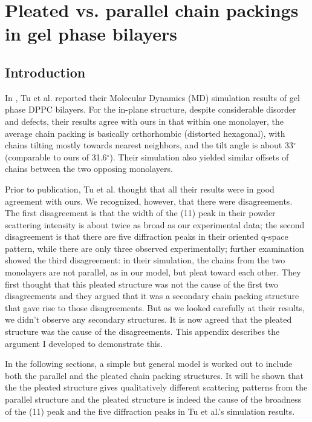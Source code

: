 \chapter{Pleated vs. parallel chain packings in gel phase bilayers}

\section{Introduction}

In \cite{Tu96}, Tu et al. reported their Molecular Dynamics (MD) 
simulation results 
of gel phase DPPC bilayers. For the in-plane structure, despite considerable
disorder and defects, their results agree with ours \cite{Sun94} in that within
one monolayer, the average chain packing is basically 
orthorhombic (distorted hexagonal), with
chains tilting mostly towards nearest neighbors, and the tilt angle is about
33$^{\circ}$ (comparable to ours of 31.6$^{\circ}$). Their simulation 
also yielded similar offsets of chains between the two opposing monolayers.

Prior to publication, Tu et al. thought that all their results were in good
agreement with ours. We recognized, however, that there were disagreements.
The first disagreement is that the width of the (11) peak in their powder
scattering intensity is about twice as broad as our experimental
data; the second disagreement is that there are five diffraction peaks
in their oriented q-space pattern, while there are only three
observed experimentally; further examination showed the third
disagreement: in their simulation, the chains from the two monolayers 
are not parallel, as in our model, but pleat toward each other. 
They first thought that this pleated structure was not the cause of the
first two disagreements and they argued that it was a secondary chain 
packing structure that gave rise to those disagreements. But as we
looked carefully at their results, we didn't observe any secondary
structures. It is now agreed that the pleated structure was the cause 
of the disagreements. This appendix describes the argument 
I developed to demonstrate this. 

In the following sections, a simple but general model is worked out
to include both the parallel and the pleated chain packing structures.
It will be shown that the the pleated structure gives qualitatively
different scattering patterns from the parallel structure and the
pleated structure is indeed the cause of the broadness of the (11)
peak and the five diffraction peaks in Tu et al.'s simulation results.

